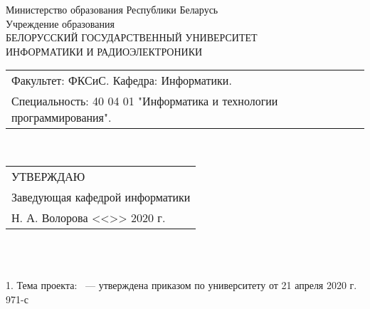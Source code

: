 {
  \thispagestyle{empty}
  \setlength{\parindent}{0em}

  \newcommand{\lineunderscore}{\uline{\hspace*{\fill}}}

  \begin{center}
    Министерство образования Республики Беларусь\\
    Учреждение образования\\
    БЕЛОРУССКИЙ ГОСУДАРСТВЕННЫЙ УНИВЕРСИТЕТ \\
    ИНФОРМАТИКИ И РАДИОЭЛЕКТРОНИКИ\\[1em]
  

  \begin{minipage}{\textwidth}
    \begin{flushleft}
      \begin{tabular}{ l }
        Факультет: ФКСиС. Кафедра: Информатики. \\
        Специальность: 40 04 01 "Информатика и технологии программирования".
      \end{tabular}
    \end{flushleft}
  \end{minipage}\\[1em]

  \begin{minipage}{\textwidth}
    \begin{flushright}
      \begin{tabular}{p{}}
        УТВЕРЖДАЮ \\
        Заведующая кафедрой информатики \\
        \underline{\hspace*{7em}} Н. А. Волорова
        <<\underline{\hspace*{4ex}}>> \underline{\hspace*{5em}} 2020 г.
      \end{tabular}
    \end{flushright}
  \end{minipage}\\[1em]

   \\

  {}

  \end{center}

  1. Тема проекта: ~--- утверждена приказом по университету от 21 апреля 2020 г.  \No{} 971-с

}
